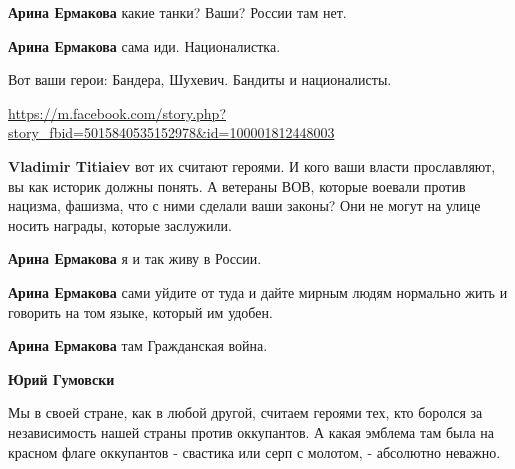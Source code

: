 \begin{itemize}
\begin{itemize}

\textbf{Арина Ермакова} какие танки? Ваши? России там нет.


\textbf{Арина Ермакова} сама иди. Националистка. 

Вот ваши герои: Бандера, Шухевич. Бандиты и националисты. 

\url{https://m.facebook.com/story.php?story_fbid=5015840535152978&id=100001812448003}


\textbf{Vladimir Titiaiev} вот их считают героями. И кого ваши власти прославляют, вы как историк должны понять. А ветераны ВОВ, которые воевали против нацизма, фашизма, что с ними сделали ваши законы? Они не могут на улице носить награды, которые заслужили.


\textbf{Арина Ермакова} я и так живу в России.


\textbf{Арина Ермакова} сами уйдите от туда и дайте мирным людям нормально жить и говорить на том языке, который им удобен.


\textbf{Арина Ермакова} там Гражданская война.


\textbf{Юрий Гумовски} 

Мы в своей стране, как в любой другой, считаем героями тех, кто боролся за
независимость нашей страны против оккупантов. А какая эмблема там была на
красном флаге оккупантов - свастика или серп с молотом, - абсолютно неважно. 


\end{itemize}
\end{itemize}
